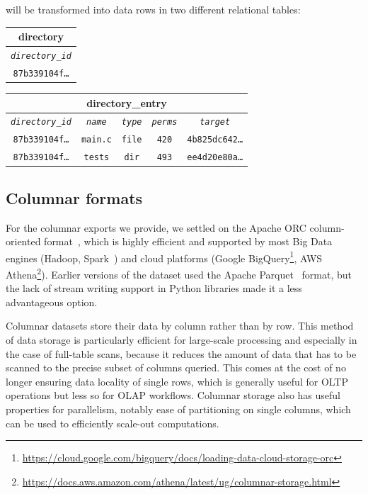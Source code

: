 will be transformed into data rows in two different relational tables:

\vspace{1em}

\begin{center}
\begin{tabular}{|c|}
    \multicolumn{1}{c}{\textbf{directory}} \\ \hline
    \emph{\texttt{directory\_id}} \\ \hline
    \texttt{87b339104f\ldots} \\ \hline
\end{tabular}
\qquad
\begin{tabular}{|c|c|c|c|c|}
    \multicolumn{5}{c}{\textbf{directory\_entry}} \\ \hline
    \emph{\texttt{directory\_id}} & \emph{\texttt{name}} & \emph{\texttt{type}}
                                  & \emph{\texttt{perms}} &
                                  \emph{\texttt{target}} \\ \hline
    \texttt{87b339104f\ldots} & \texttt{main.c} & \texttt{file} & \texttt{420}
                              & \texttt{4b825dc642\ldots} \\ \hline
    \texttt{87b339104f\ldots} & \texttt{tests} & \texttt{dir} & \texttt{493}
                              & \texttt{ee4d20e80a\ldots} \\ \hline
\end{tabular}
\end{center}

\subsection{Columnar formats}
For the columnar exports we provide, we settled on the Apache ORC
column-oriented format~\cite{huai2014orc}, which is highly efficient and
supported by most Big Data engines (Hadoop, Spark~\cite{zaharia2016apache}) and
cloud platforms (Google
BigQuery\footnote{\url{https://cloud.google.com/bigquery/docs/loading-data-cloud-storage-orc}},
AWS
Athena\footnote{\url{https://docs.aws.amazon.com/athena/latest/ug/columnar-storage.html}}).
Earlier versions of the dataset used the Apache
Parquet~\cite{twitter2013parquet,website-apache-parquet} format, but the lack
of stream writing support in Python libraries made it a less advantageous
option.

Columnar datasets store their data by column rather than by row. This method of
data storage is particularly efficient for large-scale processing and
especially in the case of full-table scans, because it reduces the amount of
data that has to be scanned to the precise subset of columns queried. This
comes at the cost of no longer ensuring data locality of single rows, which is
generally useful for \gls{OLTP} operations but less so for \gls{OLAP}
workflows. Columnar storage also has useful properties for parallelism, notably
ease of partitioning on single columns, which can be used to efficiently
scale-out computations.

